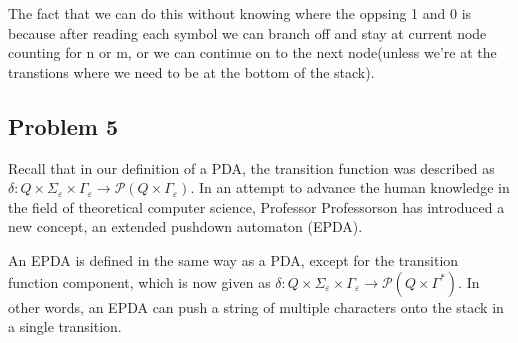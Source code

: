 \documentclass{article}
\begin{document}
\begin{enumerate}[(a)]
    The fact that we can do this without knowing where the oppsing 1 and 0 is because after
    reading each symbol we can branch off and stay at current node counting for n or m, or we
    can continue on to the next node(unless we're at the transtions where we need to be at the
    bottom of the stack).


\end{enumerate}

\newpage


\subsection*{Problem 5}
    Recall that in our definition of a PDA, the transition function was described as $\delta: Q\times\Sigma_\varepsilon\times\Gamma_\varepsilon\to\mathcal{P}(Q\times\Gamma_\varepsilon)$. In an attempt to advance the human knowledge in the field of theoretical computer science, Professor Professorson has introduced a new concept, an extended pushdown automaton (EPDA).

    An EPDA is defined in the same way as a PDA, except for the transition function component, which is now given as $\delta: Q\times\Sigma_\varepsilon\times\Gamma_\varepsilon\to\mathcal{P}(Q\times\Gamma^*)$. In other words, an EPDA can push a string of multiple characters onto the stack in a single transition. 
\end{document}
